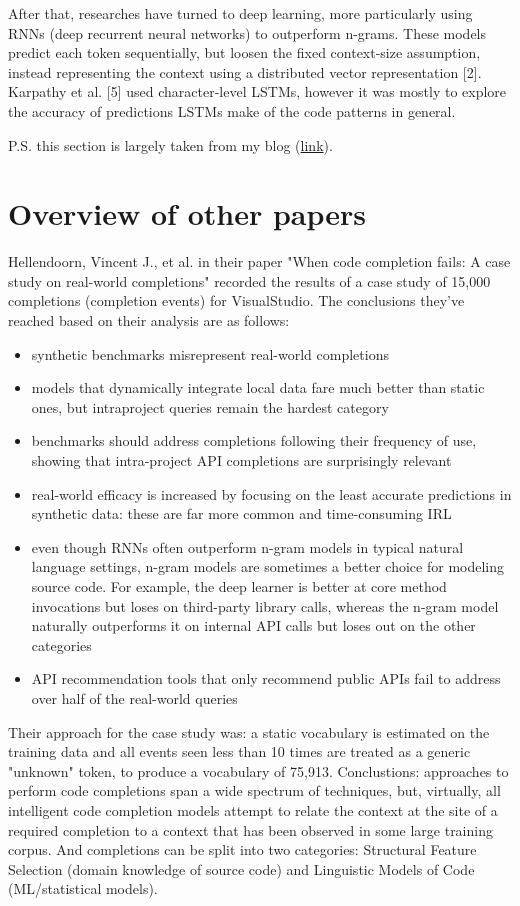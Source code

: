 After that, researches have turned to deep learning, more particularly using RNNs (deep recurrent
neural networks) to outperform n-grams. These models predict each token sequentially, but loosen
the fixed context-size assumption, instead representing the context using a distributed vector
representation [2]. Karpathy et al. [5] used character-level LSTMs, however it was mostly to explore
the accuracy of predictions LSTMs make of the code patterns in general.

P.S. this section is largely taken from my blog (\href{https://medium.com/@myroslavarm/machine-learning-for-code-completion-2583792997e3}{link}).

\section{Overview of other papers}
Hellendoorn, Vincent J., et al. in their paper "When code completion fails: A case study on real-world
completions" recorded the results of a case study of 15,000 completions (completion events) for VisualStudio.
The conclusions they've reached based on their analysis are as follows:
\begin{itemize}
	\item synthetic benchmarks misrepresent real-world completions
    \item models that dynamically integrate local data fare much better than static ones, but intraproject queries remain the hardest category
    \item benchmarks should address completions following their frequency of use, showing that intra-project API completions are surprisingly relevant
    \item real-world efficacy is increased by focusing on the least accurate predictions in synthetic data: these are far more common and time-consuming IRL
    \item even though RNNs often outperform n-gram models in typical natural language settings, n-gram models are sometimes a better choice for modeling source code. For example, the deep learner is better at core method invocations but loses on third-party library calls, whereas the n-gram model naturally outperforms it on internal API calls but loses out on the other categories
    \item API recommendation tools that only recommend public APIs fail to address over half of the real-world queries
\end{itemize}
Their approach for the case study was: a static vocabulary is estimated on the training data and
all events seen less than 10 times are treated as a generic "unknown" token, to produce a vocabulary
of 75,913. Conclustions: approaches to perform code completions span a wide spectrum of techniques,
but, virtually, all intelligent code completion models attempt to relate the context at the site of a
required completion to a context that has been observed in some large training corpus. And completions
can be split into two categories: Structural Feature Selection (domain knowledge of source code)
and Linguistic Models of Code (ML/statistical models).


